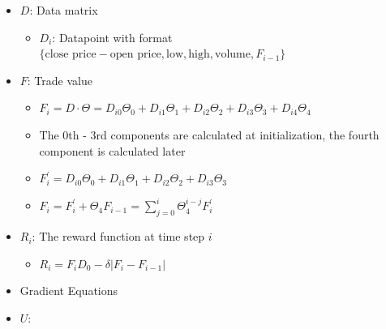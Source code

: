 \documentclass[11pt]{exam}
\theoremstyle{quest}
\newcommand{\deriv}[2]{\frac{\partial #1}{\partial #2}}
\begin{document}
\begin{itemize}
    \item $D$: Data matrix \\
    \begin{itemize}
        \item $D_i$: Datapoint with format $\{\text{close price} - \text{open price}, \text{low}, \text{high}, \text{volume},F_{i-1}\}$
    \end{itemize}
    \item $F$: Trade value%
    \begin{itemize}
        \item $F_i = D \cdot \Theta = D_{i0}\Theta_0 + D_{i1}\Theta_1 +D_{i2}\Theta_2 +D_{i3}\Theta_3 +D_{i4}\Theta_4$
        \item The 0th - 3rd components are calculated at initialization, the fourth component is calculated later
        \item $F_i^\prime =  D_{i0}\Theta_0 + D_{i1}\Theta_1 +D_{i2}\Theta_2 +D_{i3}\Theta_3$
        \item $F_i = F_i^\prime + \Theta_4 F_{i-1} = \sum_{j=0}^i \Theta_4^{i-j} F_i^\prime$

    \end{itemize}
    \item $R_i$: The reward function at time step $i$
    \begin{itemize}
        \item $R_i = F_i D_0 - \delta|F_i - F_{i-1}|$
    \end{itemize}
    \item Gradient Equations
    \item $U$: %

\end{itemize}
\end{document}
